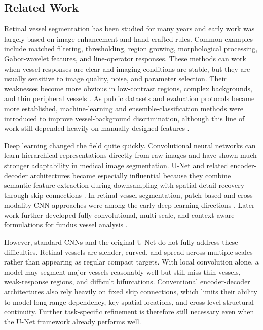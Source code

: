 \documentclass[a4paper,11pt]{article}
\begin{document}
\subsection{Related Work}
Retinal vessel segmentation has been studied for many years and early work was largely based on image enhancement and hand-crafted rules. Common examples include matched filtering, thresholding, region growing, morphological processing, Gabor-wavelet features, and line-operator responses. These methods can work when vessel responses are clear and imaging conditions are stable, but they are usually sensitive to image quality, noise, and parameter selection. Their weaknesses become more obvious in low-contrast regions, complex backgrounds, and thin peripheral vessels \cite{soares2006gabor,ricci2007line}. As public datasets and evaluation protocols became more established, machine-learning and ensemble-classification methods were introduced to improve vessel-background discrimination, although this line of work still depended heavily on manually designed features \cite{fraz2012ensemble,budai2013robust}.

Deep learning changed the field quite quickly. Convolutional neural networks can learn hierarchical representations directly from raw images and have shown much stronger adaptability in medical image segmentation. U-Net and related encoder-decoder architectures became especially influential because they combine semantic feature extraction during downsampling with spatial detail recovery through skip connections \cite{ronneberger2015unet,cicek2016unet3d,milletari2016vnet}. In retinal vessel segmentation, patch-based and cross-modality CNN approaches were among the early deep-learning directions \cite{li2016crossmodality,liskowski2016segmenting}. Later work further developed fully convolutional, multi-scale, and context-aware formulations for fundus vessel analysis \cite{maninis2016driu,fu2016deepvessel,oliveira2018fcn}.

However, standard CNNs and the original U-Net do not fully address these difficulties. Retinal vessels are slender, curved, and spread across multiple scales rather than appearing as regular compact targets. With local convolution alone, a model may segment major vessels reasonably well but still miss thin vessels, weak-response regions, and difficult bifurcations. Conventional encoder-decoder architectures also rely heavily on fixed skip connections, which limits their ability to model long-range dependency, key spatial locations, and cross-level structural continuity. Further task-specific refinement is therefore still necessary even when the U-Net framework already performs well.
\end{document}
